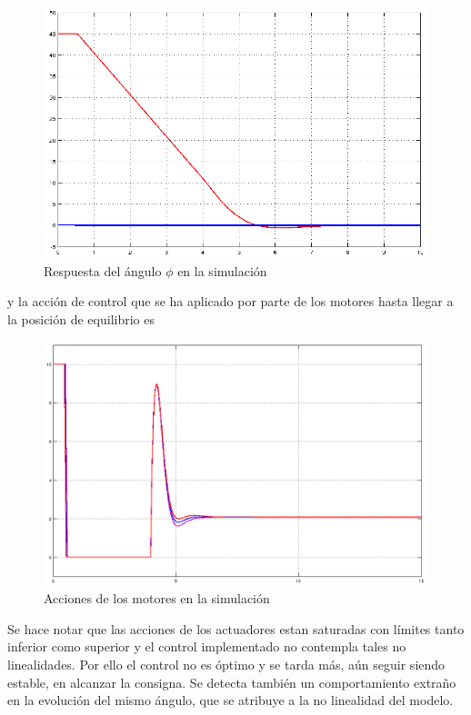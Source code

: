 \documentclass[twoside,11pt]{book}
\begin{document}
\begin{figure}[h!]
\begin{center}
\includegraphics[scale=0.4,bb=0 0 625 400]{images/simulation_2_2.png}
\end{center}
\caption{Respuesta del ángulo $\phi$ en la simulación}
\end{figure}


y la acción de control que se ha aplicado por parte de los motores hasta llegar a la posición de equilibrio es

\begin{figure}[h!]				
\begin{center}
\includegraphics[scale=0.3,bb=0 0 800 550]{images/simulation_1_1.png}
\end{center}
\caption{Acciones de los motores en la simulación}
\end{figure}

Se hace notar que las acciones de los actuadores estan saturadas con límites tanto inferior como superior y el control implementado no contempla tales no linealidades. Por ello el control no es óptimo y se tarda más, aún seguir siendo estable, en alcanzar la consigna. Se detecta también un comportamiento extraño en la evolución del mismo ángulo, que se atribuye a la no linealidad del modelo.
	
\end{document}
